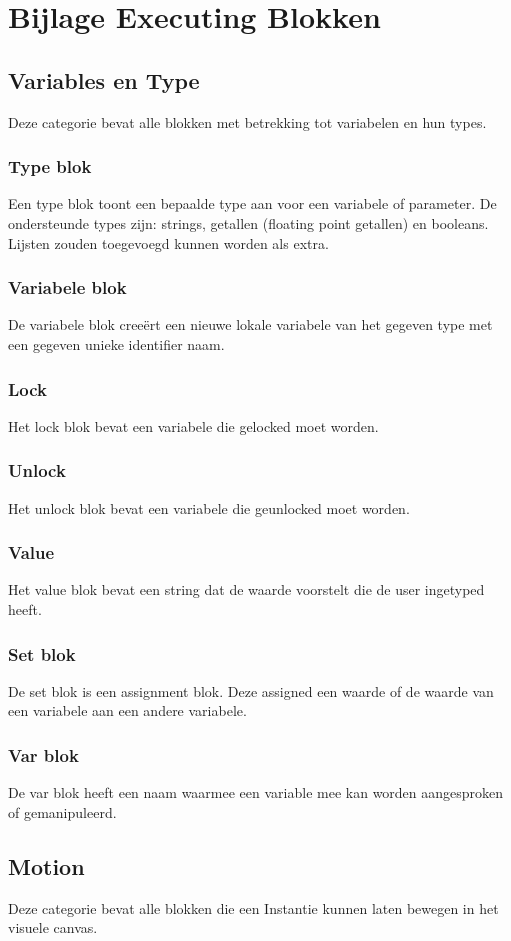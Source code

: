 \documentclass[]{article}
\begin{document}
\section{Bijlage Executing Blokken}
\label{bijlageblok}
\subsection{Variables en Type}
Deze categorie bevat alle blokken met betrekking tot variabelen en hun types. 
\subsubsection{Type blok}
Een type blok toont een bepaalde type aan voor een variabele of parameter. De ondersteunde types zijn: strings, getallen (floating point getallen) en booleans. Lijsten zouden toegevoegd kunnen worden als extra.
\subsubsection{Variabele blok}
De variabele blok cree\"{e}rt een nieuwe lokale variabele van het gegeven type met een gegeven unieke identifier naam.
\subsubsection{Lock}
Het lock blok bevat een variabele die gelocked moet worden.	
\subsubsection{Unlock}
Het unlock blok bevat een variabele die geunlocked moet worden.
\subsubsection{Value}
Het value blok bevat een string dat de waarde voorstelt die de user ingetyped heeft.
\subsubsection{Set blok}
De set blok is een assignment blok. Deze assigned een waarde of de waarde van een variabele aan een andere variabele.
\subsubsection{Var blok}
De var blok heeft een naam waarmee een variable mee kan worden aangesproken of gemanipuleerd.

\subsection{Motion}
Deze categorie bevat alle blokken die een Instantie kunnen laten bewegen in het visuele canvas. 
\end{document}
